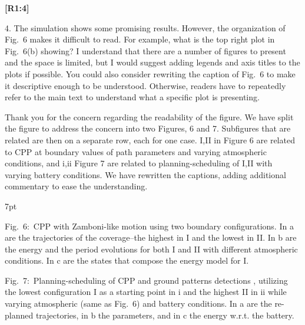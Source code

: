 \documentclass[10pt]{letter}
\newenvironment{formal}{%
  \def\FrameCommand{%
    \hspace{1pt}%
    {\color{red}\vrule width 2pt}%
    {\color{formalshade}\vrule width 4pt}%
    \colorbox{formalshade}%
  }%
  \MakeFramed{\advance\hsize-\width\FrameRestore}%
  \noindent\hspace{-4.55pt}%
  \begin{adjustwidth}{}{7pt}%
  \vspace{2pt}\vspace{2pt}%
}
{%
  \vspace{2pt}\end{adjustwidth}\endMakeFramed%
}
\begin{document}
{\hspace*{-4.5em}\textbf{[R1:4]}\vspace*{-1.9em}}


4. The simulation shows some promising results. However, the organization of Fig.~6 makes it difficult to read. For example, what is the top right plot in Fig.~6(b) showing? I understand that there are a number of figures to present and the space is limited, but I would suggest adding legends and axis titles to the plots if possible. You could also consider rewriting the caption of Fig.~6 to make it descriptive enough to be understood. Otherwise, readers have to repeatedly refer to the main text to understand what a specific plot is presenting.

{\color{blue} 


{\hspace*{-4.5em}{[R1:4]}\vspace*{-1.9em}}

Thank you for the concern regarding the readability of the figure. We have split the figure to address the concern into two Figures, 6 and 7. Subfigures that are related are then on a separate row, each for one case. I,II in Figure 6 are related to CPP at boundary values of path parameters and varying atmospheric conditions, and i,ii Figure 7 are related to planning-scheduling of I,II with varying battery conditions. We have rewritten the captions, adding additional commentary to ease the understanding.

\begin{formal}
  \footnotesize
  
  {\color{blue}Fig.~6:~\color{blue}CPP with Zamboni-like motion using two boundary configurations. In {\color{red}a} are the trajectories of the coverage--the highest in {\color{red}I} and the lowest in {\color{red}II}. In {\color{red}b} are the energy and the period evolutions for both {\color{red}I} and {\color{red}II} with different atmospheric conditions. In {\color{red}c} are the states that compose the energy model for {\color{red}I}.}

  
  \vspace*{-.6ex}
  {\color{blue}
  Fig.~7:~Planning-scheduling of CPP and ground patterns detections%
  , utilizing the lowest configuration {\color{red}I} as a starting point in {\color{red}i} and the highest {\color{red}II} in {\color{red}ii} while varying atmospheric (same as Fig.~{\color{red}6}) and battery conditions. In {\color{red}a} are the re-planned trajectories, in {\color{red}b} the parameters, and in {\color{red}c} the energy w.r.t. the battery.}
  \vspace*{1ex}
\end{formal}
}
\end{document}

